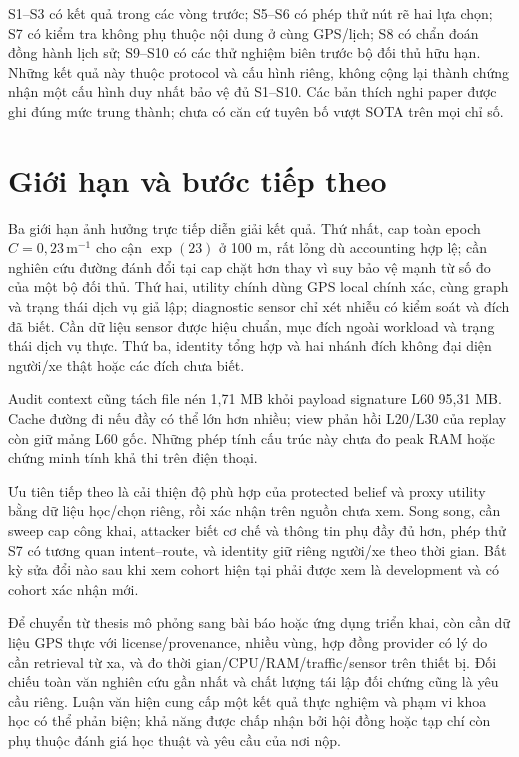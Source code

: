 S1--S3 có kết quả trong các vòng trước; S5--S6 có phép thử nút rẽ hai lựa chọn; S7 có kiểm tra không phụ thuộc nội dung ở cùng GPS/lịch; S8 có chẩn đoán đồng hành lịch sử; S9--S10 có các thử nghiệm biên trước bộ đối thủ hữu hạn. Những kết quả này thuộc protocol và cấu hình riêng, không cộng lại thành chứng nhận một cấu hình duy nhất bảo vệ đủ S1--S10. Các bản thích nghi paper được ghi đúng mức trung thành; chưa có căn cứ tuyên bố vượt SOTA trên mọi chỉ số.

\section{Giới hạn và bước tiếp theo}

Ba giới hạn ảnh hưởng trực tiếp diễn giải kết quả. Thứ nhất, cap toàn epoch $C=0{,}23\,\mathrm m^{-1}$ cho cận $\exp(23)$ ở 100 m, rất lỏng dù accounting hợp lệ; cần nghiên cứu đường đánh đổi tại cap chặt hơn thay vì suy bảo vệ mạnh từ số đo của một bộ đối thủ. Thứ hai, utility chính dùng GPS local chính xác, cùng graph và trạng thái dịch vụ giả lập; diagnostic sensor chỉ xét nhiễu có kiểm soát và đích đã biết. Cần dữ liệu sensor được hiệu chuẩn, mục đích ngoài workload và trạng thái dịch vụ thực. Thứ ba, identity tổng hợp và hai nhánh đích không đại diện người/xe thật hoặc các đích chưa biết.

Audit context cũng tách file nén 1,71 MB khỏi payload signature L60 95,31 MB. Cache đường đi nếu đầy có thể lớn hơn nhiều; view phản hồi L20/L30 của replay còn giữ mảng L60 gốc. Những phép tính cấu trúc này chưa đo peak RAM hoặc chứng minh tính khả thi trên điện thoại.

Ưu tiên tiếp theo là cải thiện độ phù hợp của protected belief và proxy utility bằng dữ liệu học/chọn riêng, rồi xác nhận trên nguồn chưa xem. Song song, cần sweep cap công khai, attacker biết cơ chế và thông tin phụ đầy đủ hơn, phép thử S7 có tương quan intent--route, và identity giữ riêng người/xe theo thời gian. Bất kỳ sửa đổi nào sau khi xem cohort hiện tại phải được xem là development và có cohort xác nhận mới.

Để chuyển từ thesis mô phỏng sang bài báo hoặc ứng dụng triển khai, còn cần dữ liệu GPS thực với license/provenance, nhiều vùng, hợp đồng provider có lý do cần retrieval từ xa, và đo thời gian/CPU/RAM/traffic/sensor trên thiết bị. Đối chiếu toàn văn nghiên cứu gần nhất và chất lượng tái lập đối chứng cũng là yêu cầu riêng. Luận văn hiện cung cấp một kết quả thực nghiệm và phạm vi khoa học có thể phản biện; khả năng được chấp nhận bởi hội đồng hoặc tạp chí còn phụ thuộc đánh giá học thuật và yêu cầu của nơi nộp.
